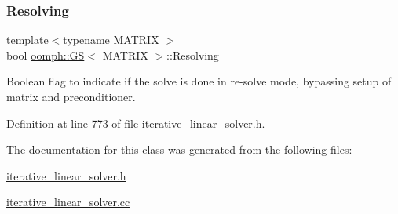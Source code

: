 \subsubsection{\texorpdfstring{Resolving}{Resolving}}
{\footnotesize\ttfamily template$<$typename M\+A\+T\+R\+IX $>$ \\
bool \hyperlink{classoomph_1_1GS}{oomph\+::\+GS}$<$ M\+A\+T\+R\+IX $>$\+::Resolving\hspace{0.3cm}{\ttfamily [private]}}



Boolean flag to indicate if the solve is done in re-\/solve mode, bypassing setup of matrix and preconditioner. 



Definition at line 773 of file iterative\+\_\+linear\+\_\+solver.\+h.



The documentation for this class was generated from the following files\+:\begin{DoxyCompactItemize}
\item 
\hyperlink{iterative__linear__solver_8h}{iterative\+\_\+linear\+\_\+solver.\+h}\item 
\hyperlink{iterative__linear__solver_8cc}{iterative\+\_\+linear\+\_\+solver.\+cc}\end{DoxyCompactItemize}

